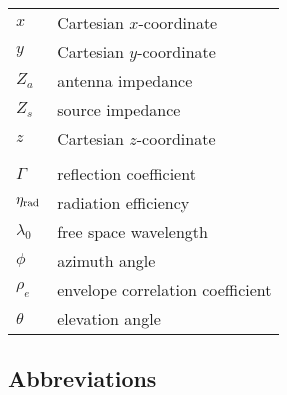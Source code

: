 \begin{tabular}{ll}
$x$          & Cartesian $x$-coordinate\\
$y$          & Cartesian $y$-coordinate\\
$Z_a$        & antenna impedance\\
$Z_s$        & source impedance\\
$z$          & Cartesian $z$-coordinate\\
& \\
$\Gamma$     & reflection coefficient\\
${\eta}_{\mathrm{rad}}$ & radiation efficiency \\
$\lambda_0$  & free space wavelength\\
$\phi$       & azimuth angle\\
$\rho_e$     & envelope correlation coefficient\\
$\theta$     & elevation angle\\


\end{tabular}



\subsection*{Abbreviations}

